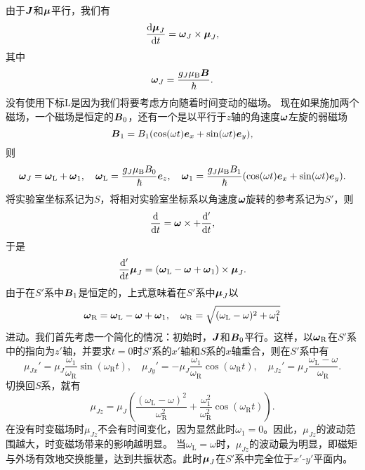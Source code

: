 由于$\vb*{J}$和$\vb*{\mu}$平行，我们有
\[
    \dv{\vb*{\mu}_J}{t} = \vb*{\omega}_J \times \vb*{\mu}_J,
\]
其中
\[
    \vb*{\omega}_J = \frac{g_J \mu_\text{B} \vb*{B}}{\hbar}.
\]
没有使用下标L是因为我们将要考虑方向随着时间变动的磁场。
现在如果施加两个磁场，一个磁场是恒定的$\vb*{B}_0$，还有一个是以平行于$z$轴的角速度$\vb*{\omega}$左旋的弱磁场
\begin{equation}
    \vb*{B}_1 = B_1 (\cos(\omega t) \vb*{e}_x + \sin(\omega t) \vb*{e}_y),
\end{equation}
则
\begin{equation}
    \vb*{\omega}_J = \vb*{\omega}_\text{L} + \vb*{\omega}_{1}, \quad \vb*{\omega}_\text{L} = \frac{g_J \mu_\text{B} B_0}{\hbar} \vb*{e}_z, \quad \vb*{\omega}_1 = \frac{g_J \mu_\text{B} B_1}{\hbar} (\cos(\omega t) \vb*{e}_x + \sin (\omega t) \vb*{e}_y).
\end{equation}
将实验室坐标系记为$S$，将相对实验室坐标系以角速度$\vb*{\omega}$旋转的参考系记为$S'$，则
\[
    \dv{t} = \vb*{\omega} \times + \dv'{t},
\]
于是
\[
    \dv'{t} \vb*{\mu}_J = (\vb*{\omega}_\text{L} - \vb*{\omega} + \vb*{\omega}_1) \times \vb*{\mu}_J.
\]
由于在$S'$系中$\vb*{B}_1$是恒定的，上式意味着在$S'$系中$\vb*{\mu}_J$以
\begin{equation}
    \vb*{\omega}_\text{R} = \vb*{\omega}_\text{L} - \vb*{\omega} + \vb*{\omega}_1, \quad \omega_\text{R} = \sqrt{(\omega_\text{L} - \omega)^2 + \omega_1^2}
\end{equation}
进动。我们首先考虑一个简化的情况：初始时，$\vb*{J}$和$\vb*{B}_0$平行。这样，以$\vb*{\omega}_\text{R}$在$S'$系中的指向为$z'$轴，并要求$t=0$时$S'$系的$x'$轴和$S$系的$x$轴重合，则在$S'$系中有
\begin{equation}
    \mu_{Jx}' = \mu_J \frac{\omega_1}{\omega_\text{R}} \sin (\omega_\text{R} t), \quad \mu_{Jy}' = - \mu_J \frac{\omega_1}{\omega_\text{R}} \cos (\omega_\text{R} t), \quad \mu_{Jz}' = \mu_J \frac{\omega_\text{L} - \omega}{\omega_\text{R}}.
\end{equation}
切换回$S$系，就有
\begin{equation}
    \mu_{Jz} = \mu_J \left( \frac{(\omega_\text{L} - \omega)^2}{\omega_\text{R}^2} + \frac{\omega_1^2}{\omega_\text{R}^2} \cos (\omega_\text{R} t) \right).
\end{equation}
在没有时变磁场时$\mu_{Jz}$不会有时间变化，因为显然此时$\omega_1=0$。因此，$\mu_{Jz}$的波动范围越大，时变磁场带来的影响越明显。
当$\omega_\text{L}=\omega$时，$\mu_{Jz}$的波动最为明显，即磁矩与外场有效地交换能量，达到共振状态。此时$\vb*{\mu}_J$在$S'$系中完全位于$x'$-$y'$平面内。
